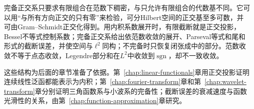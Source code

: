 完备正交系只要求有限组合在范数下稠密，与只允许有限组合的代数基不同。它可以用“与所有方向正交的只有零”来检验，可分Hilbert空间的正交基至多可数，并可由Gram--Schmidt正交化得到。用内积系数展开时，有限截断就是正交投影，Bessel不等式控制系数；完备正交系给出依范数收敛的展开、Parseval等式和尾和形式的截断误差，并使空间与$\ell^2$同构；不完备时只恢复闭张成中的部分。范数收敛不等于点态收敛，Legendre部分和在$L^2$中收敛到$\operatorname{sgn}$，却不一致收敛。

这些结构为后面的章节准备了依据。第~\ref{chap:linear-functionals}章用正交投影证明连续线性泛函都能表示为内积；第~\ref{chap:fourier-transform}章和第~\ref{chap:wavelet-transform}章分别证明三角函数系与小波系的完备性；截断误差的衰减速度与函数光滑性的关系，由第~\ref{chap:function-approximation}章研究。

